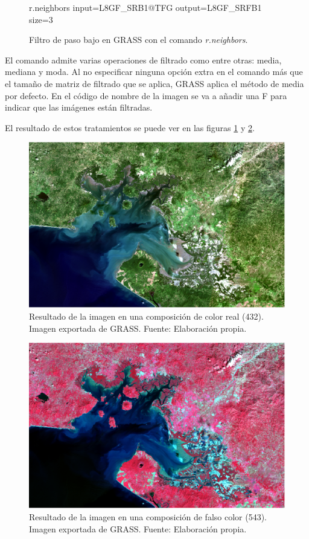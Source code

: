 \begin{figure}[ht]
\centering
\begin{boxedverbatim}
	r.neighbors input=L8GF_SRB1@TFG output=L8GF_SRFB1 size=3
\end{boxedverbatim}
\caption[Filtro de paso bajo]{Filtro de paso bajo en GRASS con el comando \textit{r.neighbors}.}
\end{figure}

El comando admite varias operaciones de filtrado como entre otras: media, mediana y moda. Al no especificar ninguna opción extra en el comando más que el tamaño de matriz de filtrado que se aplica, GRASS aplica el método de media por defecto. En el código de nombre de la imagen se va a añadir una F para indicar que las imágenes están filtradas.

El resultado de estos tratamientos se puede ver en las figuras \ref{fig:gf432} y \ref{fig:gf543}.
\begin{figure}
	\centering
	\includegraphics[width=0.9\linewidth]{./Imagenes/GF432.eps}
	\caption[Composición en color real]{Resultado de la imagen en una composición de color real (432). Imagen exportada de GRASS. Fuente: Elaboración propia.}
	\label{fig:gf432}
\end{figure}

\begin{figure}
	\centering
	\includegraphics[width=0.9\linewidth]{./Imagenes/GF543.eps}
	\caption[Composición en falso color]{Resultado de la imagen en una composición de falso color (543). Imagen exportada de GRASS. Fuente: Elaboración propia.}
	\label{fig:gf543}
\end{figure}

